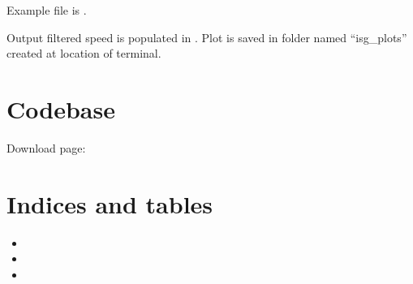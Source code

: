 \documentclass[letterpaper,10pt,english]{sphinxmanual}
\begin{document}
\sphinxAtStartPar
Example  file is .

\sphinxAtStartPar
Output filtered speed is populated in .
Plot is saved in folder named “isg\_plots” created at location of terminal.

\noindent{}


\chapter{Codebase}
\label{\detokenize{index:codebase}}
\sphinxAtStartPar
Download page: 


\chapter{Indices and tables}
\label{\detokenize{index:indices-and-tables}}\begin{itemize}
\item {} 
\sphinxAtStartPar
{}

\item {} 
\sphinxAtStartPar
{}

\item {} 
\sphinxAtStartPar
{}

\end{itemize}



\renewcommand{\indexname}{Index}
\printindex
\end{document}
